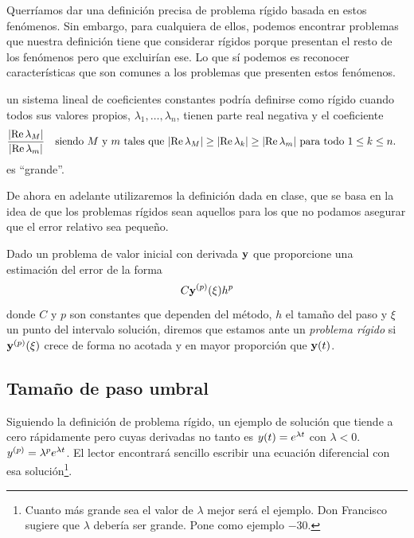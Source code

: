 Querríamos dar una definición precisa de problema rígido
basada en estos fenómenos.
Sin embargo, para cualquiera de ellos, podemos encontrar problemas
que nuestra definición tiene que considerar rígidos porque
presentan el resto de los fenómenos
pero que excluirían ese.
Lo que sí podemos es reconocer características que son comunes
a los problemas que presenten estos fenómenos.

\begin{example}
    un sistema lineal de coeficientes constantes podría definirse como rígido
    cuando todos sus valores propios, $\lambda_1,\ldots,\lambda_n$,
    tienen parte real negativa y el coeficiente
    \begin{equation*}
        \frac{\abs{\Re\lambda_M}}{\abs{\Re\lambda_m}}
        \qq{siendo $M$ y $m$ tales que
        $\abs{\Re\lambda_M} \ge \abs{\Re\lambda_k} \ge \abs{\Re\lambda_m}$
        para todo $1 \le k \le n$.}
    \end{equation*}
    es ``grande''.
\end{example}

De ahora en adelante utilizaremos la definición dada en clase,
que se basa en la idea de que los problemas rígidos sean aquellos
para los que no podamos asegurar que el error relativo sea pequeño.

\begin{definition}
    Dado un problema de valor inicial con derivada $\vb{y}{}$
    que proporcione una estimación del error de la forma
    \begin{equation*}
        C\vb{y}{}^{(p)}(\xi)h^p
    \end{equation*}
    donde $C$ y $p$ son constantes que dependen del método,
    $h$ el tamaño del paso y $\xi$ un punto del intervalo solución,
    diremos que estamos ante un \emph{problema rígido} si
    $\vb{y}{}^{(p)}(\xi)$ crece de forma no acotada
    y en mayor proporción que $\vb{y}{}(t)$.
\end{definition}

\subsection{Tamaño de paso umbral}

Siguiendo la definición de problema rígido,
un ejemplo de solución que tiende a cero rápidamente
pero cuyas derivadas no tanto es
$y(t) = e^{\lambda t}$ con $\lambda < 0$.
$y^{(p)} = \lambda^pe^{\lambda t}$.
El lector encontrará sencillo
escribir una ecuación diferencial con esa solución\footnote{
    Cuanto más grande sea el valor de $\lambda$ mejor será el ejemplo.
    Don Francisco sugiere que $\lambda$ debería ser grande.
    Pone como ejemplo $-30$.
}.

